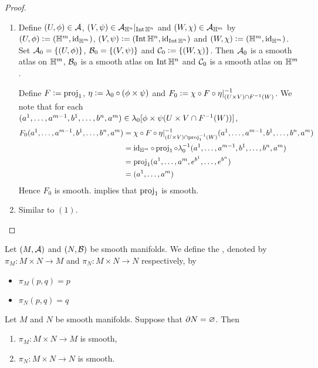 \documentclass{book}
\begin{document}
\begin{proof}\
	\begin{enumerate}
		\item Define $(U, \phi) \in \mathcal{A}$, $(V, \psi) \in \mathcal{A}_{\mathbb{H}^n}|_{\operatorname{Int} \mathbb{H}^n}$ and $(W, \chi) \in \mathcal{A}_{\mathbb{H}^m}$ by $(U, \phi) \vcentcolon= (\mathbb{H}^m, \operatorname{id}_{\mathbb{H}^m})$, $(V, \psi) \vcentcolon= (\operatorname{Int} \mathbb{H}^n, \operatorname{id}_{\operatorname{Int} \mathbb{H}^n})$ and $(W, \chi) \vcentcolon= (\mathbb{H}^m, \operatorname{id}_{\mathbb{H}^m})$. Set $\mathcal{A}_0 = \{(U, \phi)\}$, $\mathcal{B}_0 = \{(V, \psi)\}$ and $\mathcal{C}_0 \vcentcolon= \{(W, \chi)\}$. Then $\mathcal{A}_0$ is a smooth atlas on $\mathbb{H}^m$, $\mathcal{B}_0$ is a smooth atlas on $\operatorname{Int} \mathbb{H}^n$ and $\mathcal{C}_0$ is a smooth atlas on $\mathbb{H}^m$. 
		
		Define $F \vcentcolon= \operatorname{\text{proj}}_1$, $\eta \vcentcolon= \lambda_0 \circ (\phi \times \psi)$ and $F_0 \vcentcolon= \chi \circ F \circ \eta|_{(U \times V) \cap F^{-1}(W)}^{-1}$. We note that for each $(a^1, \ldots, a^{m-1}, b^1, \ldots, b^n, a^m) \in \lambda_0[\phi \times \psi(U \times V \cap F^{-1}(W)) ]$, 
		\begin{align*}
			F_0 (a^1, \ldots, a^{m-1}, b^1, \ldots, b^n, a^m)
			& = \chi \circ F \circ \eta|_{(U \times V) \cap \operatorname{\text{proj}}_1^{-1}(W)}^{-1}(a^1, \ldots, a^{m-1}, b^1, \ldots, b^n, a^m) \\
			& = \operatorname{id}_{\mathbb{H}^m} \circ \operatorname{\text{proj}}_1 \circ \lambda_0^{-1}(a^1, \ldots, a^{m-1}, b^1, \ldots, b^n, a^m) \\
			& = \operatorname{\text{proj}}_1(a^1, \ldots, a^m, e^{b^1}, \ldots, e^{b^n}) \\
			& = (a^1, \ldots, a^m)
		\end{align*}
		Hence $F_0$ is smooth.  implies that $\operatorname{\text{proj}}_1$ is smooth.
		\item Similar to $(1)$.
	\end{enumerate}
\end{proof}


\begin{defn} 
	Let $(M,\mathcal{A})$ and $(N, \mathcal{B})$ be smooth manifolds. We define the , denoted by $\pi_M: M \times N \rightarrow M$ and $\pi_N: M \times N \rightarrow N$  respectively, by 
	\begin{itemize}
		\item $\pi_M(p,q) = p$ 
		\item $\pi_N(p,q) = q$ 
	\end{itemize}
\end{defn}

\begin{ex} 
	Let $M$ and $N$ be smooth manifolds. Suppose that $\partial N = \varnothing$. Then 
	\begin{enumerate}
		\item $\pi_M: M \times N \rightarrow M$ is smooth, 
		\item $\pi_N: M \times N \rightarrow N$ is smooth.
	\end{enumerate}
\end{ex}
\end{document}
